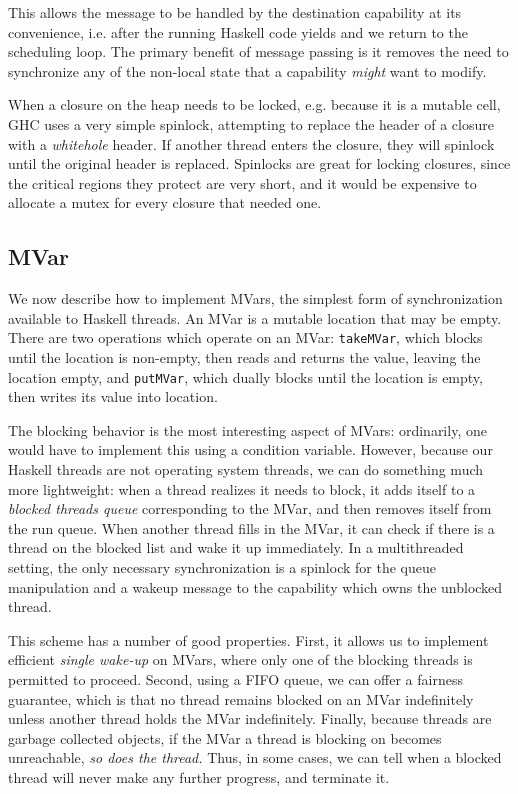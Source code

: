 This allows the message to be handled by the destination capability at
its convenience, i.e. after the running Haskell code yields and we
return to the scheduling loop.  The primary benefit of message passing
is it removes the need to synchronize any of the non-local state that a
capability \emph{might} want to modify. 

When a closure on the heap needs to be locked, e.g. because it is a
mutable cell, GHC uses a very simple spinlock, attempting to replace the
header of a closure with a \emph{whitehole} header.  If another thread
enters the closure, they will spinlock until the original header is
replaced.  Spinlocks are great for locking closures, since the critical
regions they protect are very short, and it would be expensive to
allocate a mutex for every closure that needed one.

\subsection{MVar}

We now describe how to implement MVars, the simplest form of
synchronization available to Haskell threads.  An MVar is a mutable
location that may be empty.  There are two operations which operate on
an MVar: \verb|takeMVar|, which blocks until the location is non-empty,
then reads and returns the value, leaving the location empty, and
\verb|putMVar|, which dually blocks until the location is empty, then
writes its value into location.

The blocking behavior is the most interesting aspect of MVars:
ordinarily, one would have to implement this using a condition variable.
However, because our Haskell threads are not operating system threads,
we can do something much more lightweight: when a thread realizes it
needs to block, it adds itself to a \emph{blocked threads queue}
corresponding to the MVar, and then removes itself from the run queue.
When another thread fills in the MVar, it can check if there is a thread
on the blocked list and wake it up immediately.  In a multithreaded
setting, the only necessary synchronization is a spinlock for the queue
manipulation and a wakeup message to the capability which owns the
unblocked thread.

This scheme has a number of good properties.  First, it allows us
to implement efficient \emph{single wake-up} on MVars, where only one of
the blocking threads is permitted to proceed. Second, using a FIFO
queue, we can offer a fairness guarantee, which is that no thread
remains blocked on an MVar indefinitely unless another thread holds the
MVar indefinitely.  Finally, because threads are garbage collected
objects, if the MVar a thread is blocking on becomes unreachable,
\emph{so does the thread.}  Thus, in some cases, we can tell when
a blocked thread will never make any further progress, and terminate it.

